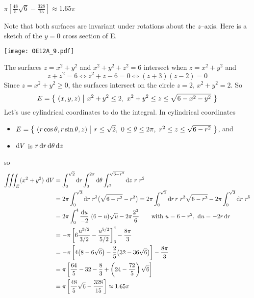 %

\begin{answer}
$\pi\left[\frac{48}{5}\sqrt{6}-\frac{328}{15}\right] 
\approx 1.65\pi$
\end{answer}

\begin{solution}
Note that both surfaces are invariant under rotations about the
$z$--axis. Here is a sketch of the $y=0$ cross section of E.
\begin{center}
     \texttt{[image: OE12A\_9.pdf]}
\end{center}
The surfaces $z = x^2 + y^2$ and $x^2 + y^2 + z^2 = 6$
intersect when $z=x^2+y^2$ and
\begin{equation*}
z+z^2=6
\iff z^2+z-6=0
\iff(z+3)(z-2)=0
\end{equation*}
Since $z=x^2+y^2\ge 0$, the surfaces intersect on the circle $z=2$,
$x^2+y^2=2$. So 
\begin{equation*}
E = \Set{(x,y,z)}{ x^2+y^2\le 2,\ x^2+y^2\le z\le \sqrt{6-x^2-y^2}}
\end{equation*}
Let's use cylindrical coordinates to do the integral.
In cylindrical coordinates 
\begin{itemize}
\item
$E = \Set{(r\cos\theta,r\sin\theta,z)}{ r\le \sqrt{2},\ 0\le\theta\le 2\pi,\ 
                                     r^2\le z\le \sqrt{6-r^2}}$, and
\item
$\mathrm{d}V$ is $r\,\mathrm{d}r\,\mathrm{d}\theta\,\mathrm{d}z$
\end{itemize}
so
\begin{align*}
\iiint_E (x^2+y^2)\ \mathrm{d}V
&=\int_0^{\sqrt{2}}\mathrm{d}r \int_0^{2\pi}\mathrm{d}\theta
   \int_{r^2}^{\sqrt{6-r^2}} \mathrm{d}z\ r\ r^2 \\
&=2\pi\int_0^{\sqrt{2}}\mathrm{d}r  \ r^3\big(\sqrt{6-r^2}-r^2\big)
 =2\pi\int_0^{\sqrt{2}}\mathrm{d}r\,r\ r^2\sqrt{6-r^2}
   - 2\pi\int_0^{\sqrt{2}}\mathrm{d}r  \ r^5\\
&=2\pi\int_6^4\frac{\mathrm{d}u}{-2}  \ (6-u)\sqrt{u} -2\pi\frac{2^3}{6}
\qquad\text{with } u = 6-r^2,\ \mathrm{d}u = -2r\,\mathrm{d}r \\
&=-\pi\left[6\frac{u^{3/2}}{3/2}-\frac{u^{5/2}}{5/2}\right]_6^4-\frac{8\pi}{3}\\
&=-\pi\left[4\big(8-6\sqrt{6}\big)-\frac{2}{5}\big(32-36\sqrt{6}\big)\right]
             -\frac{8\pi}{3}\\
&=\pi\left[\frac{64}{5}-32-\frac{8}{3} 
         +\left(24-\frac{72}{5}\right)\sqrt{6}\right] \\
&=\pi\left[\frac{48}{5}\sqrt{6}-\frac{328}{15}\right] 
\approx 1.65\pi
\end{align*}
\end{solution}

